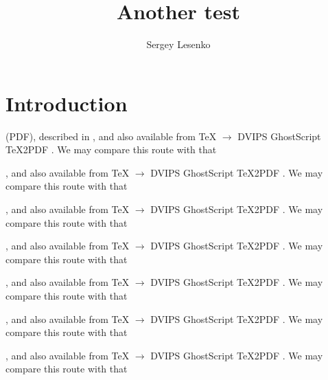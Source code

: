 \documentclass{article}
\begin{document}
\title{Another test}
\author{Sergey Lesenko}
\maketitle

\section{Introduction}
(PDF), described in
\cite{Adobe,Deutsch}, and also available from
\TeX{} $\longrightarrow$ DVIPS\cite{Rokicki}
GhostScript\cite{Deutsch}
TeX2PDF\cite{Sojka}
\cite{Haralambous:TB16-2-162}.  We may compare this route with that

\citeyear{Adobe}, and also available from
\TeX{} $\longrightarrow$ DVIPS\citeyear{Rokicki}
GhostScript\citeyear{Deutsch}
TeX2PDF\citeyear{Sojka}
\citeyear{Haralambous:TB16-2-162}.  We may compare this route with that

\citeauthor{Adobe}, and also available from
\TeX{} $\longrightarrow$ DVIPS\citeauthor{Rokicki}
GhostScript\citeauthor{Deutsch}
TeX2PDF\citeauthor{Sojka}
\citeauthor{Haralambous:TB16-2-162}.  We may compare this route with that

, and also available from
\TeX{} $\longrightarrow$ DVIPS
GhostScript
TeX2PDF
.  We may compare this route with that

\citet{Adobe}, and also available from
\TeX{} $\longrightarrow$ DVIPS\citet{Rokicki}
GhostScript\citet{Deutsch}
TeX2PDF\citet{Sojka}
\citet{Haralambous:TB16-2-162}.  We may compare this route with that

\citealt{Adobe}, and also available from
\TeX{} $\longrightarrow$ DVIPS\citealt{Rokicki}
GhostScript\citealt{Deutsch}
TeX2PDF\citealt{Sojka}
\citealt{Haralambous:TB16-2-162}.  We may compare this route with that

\cite*{Adobe}, and also available from
\TeX{} $\longrightarrow$ DVIPS\cite*{Rokicki}
GhostScript\cite*{Deutsch}
TeX2PDF\cite*{Sojka}
\cite*{Haralambous:TB16-2-162}.  We may compare this route with that


\end{document}
